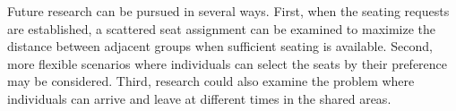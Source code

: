 



Future research can be pursued in several ways. First, when the seating requests are established, a scattered seat assignment can be examined to maximize the distance between adjacent groups when sufficient seating is available. Second, more flexible scenarios where individuals can select the seats by their preference may be considered. Third, research could also examine the problem where 
individuals can arrive and leave at different times in the shared areas.

